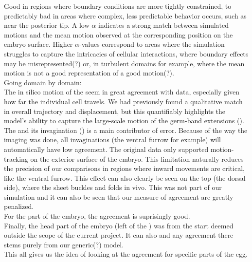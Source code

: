 Good in regions where boundary conditions are more tightly constrained, to predictably bad in areas where complex, less predictable behavior occurs, such as near the posterior tip.  A low $\alpha$ indicates a strong match between simulated motions and the mean motion observed at the corresponding position on the embryo surface. Higher $\alpha$-values correspond to areas where the simulation struggles to capture the intricacies of cellular interactions, where boundary effects may be misrepresented(?) or, in turbulent domains for example, where the mean motion is not a good representation of a good motion(?).\\

Going domain by domain:\\

The in silico motion of the  seem in great agreement with data, especially given how far the individual cell travels. We had previously found a qualitative match in overall trajectory and displacement, but this quantifiably highlights the model's ability to capture the large-scale motion of the germ-band extensions ().\\

The  and its invagination () is a main contributor of error. Because of the way the imaging was done, all invaginations (the ventral furrow for example) will automatically have low agreement. The original data only supported motion-tracking on the exterior surface of the embryo.  This limitation naturally reduces the precision of our comparisons in regions where inward movements are critical, like the ventral furrow. This effect can also clearly be seen on the top (the dorsal side), where the sheet buckles and folds in vivo. This was not part of our simulation and it can also be seen that our measure of agreement are greatly penalized.\\

For the  part of the embryo, the agreement is suprisingly good. \\


Finally, the head part of the embryo (left of the ) was from the start deemed outside the scope of the current project. It can also  and any agreement there stems purely from our generic(?) model.\\



This all gives us the idea of looking at the agreement for specific parts of the egg.

